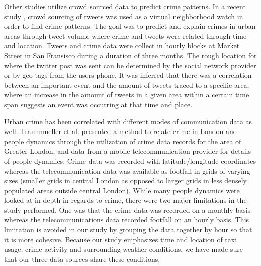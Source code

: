 \documentclass{sigkddExp}
\begin{document}
Other studies utilize crowd sourced data to predict crime patterns. In a recent study \cite{Bendler14}, crowd sourcing of tweets was used as a virtual neighborhood watch in order to find crime patterns. The goal was to predict and explain crimes in urban areas through tweet volume where crime and tweets were related through time and location. Tweets and crime data were collect in hourly blocks at Market Street in San Fransisco during a duration of three months. The rough location for where the twitter post was sent can be determined by the social network provider or by geo-tags from the users phone. It was inferred that there was a correlation between an important event and the amount of tweets traced to a specific area, where an increase in the amount of tweets in a given area within a certain time span suggests an event was occurring at that time and place. 

Urban crime has been correlated with different modes of communication data as well. Traunmueller et al. \cite{Traunmueller14} presented a method to relate crime in London and people dynamics through the utilization of crime data records for the area of Greater London, and data from a mobile telecommunication provider for details of people dynamics. Crime data was recorded with latitude/longitude coordinates whereas the telecommunication data was available as footfall in grids of varying sizes (smaller grids in central London as opposed to larger grids in less densely populated areas outside central London). While many people dynamics were looked at in depth in regards to crime, there were two major limitations in the study performed. One was that the crime data was recorded on a monthly basis whereas the telecommunications data recorded footfall on an hourly basis. This limitation is avoided in our study by grouping the data together by hour so that it is more cohesive. Because our study emphasizes time and location of taxi usage, crime activity and surrounding weather conditions, we have made sure that our three data sources share these conditions.
\end{document}
